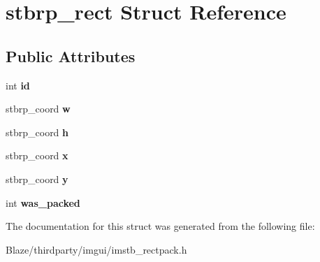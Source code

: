 \hypertarget{structstbrp__rect}{}\section{stbrp\+\_\+rect Struct Reference}
\label{structstbrp__rect}
\subsection*{Public Attributes}
\begin{DoxyCompactItemize}
\item 
\mbox{\label{structstbrp__rect_a92da8626bc99df041c0c3bfd01c25f7a}} 
int {\bfseries id}
\item 
\mbox{\label{structstbrp__rect_a248d43f1eb979c1e7b92ba6df431dec5}} 
stbrp\+\_\+coord {\bfseries w}
\item 
\mbox{\label{structstbrp__rect_af68de2dadc7972b7c089d5e0c0558398}} 
stbrp\+\_\+coord {\bfseries h}
\item 
\mbox{\label{structstbrp__rect_a4cc623a3e29f0bc0d3375f6645c84d18}} 
stbrp\+\_\+coord {\bfseries x}
\item 
\mbox{\label{structstbrp__rect_ae3034c1fbf86043b568f5a4dddf946fa}} 
stbrp\+\_\+coord {\bfseries y}
\item 
\mbox{\label{structstbrp__rect_a74ba347755ce17f2f8a2ea66c612af49}} 
int {\bfseries was\+\_\+packed}
\end{DoxyCompactItemize}


The documentation for this struct was generated from the following file\+:\begin{DoxyCompactItemize}
\item 
Blaze/thirdparty/imgui/imstb\+\_\+rectpack.\+h\end{DoxyCompactItemize}
